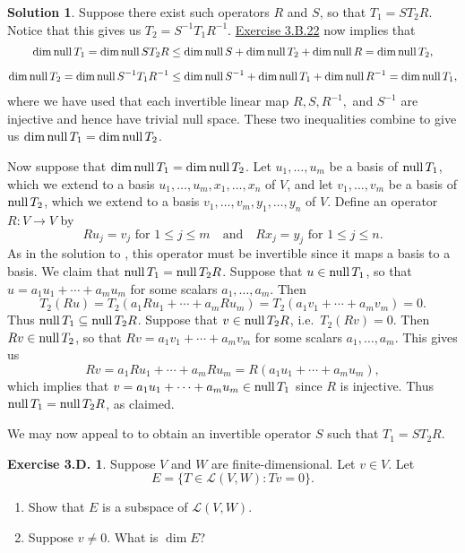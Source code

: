 \documentclass[12pt]{article}
\theoremstyle{definition}
\theoremstyle{exercise}
\newtheorem{exercise}{Exercise 3.D.}
\theoremstyle{solution}
\newtheorem*{solution}{Solution}
\newcommand{\lmap}{\mathcal{L}}
\newcommand{\Null}{\text{null\,}}
\newcommand{\quand}{\quad \text{and} \quad}
\begin{document}
\begin{solution}
    Suppose there exist such operators \( R \) and \( S \), so that \( T_1 = ST_2R \). Notice that this gives us \( T_2 = S^{-1}T_1R^{-1} \). \href{https://lew98.github.io/Mathematics/LADR_Section_3_B_Exercises.pdf}{Exercise 3.B.22} now implies that
    \begin{gather*}
        \dim \Null T_1 = \dim \Null ST_2R \leq \dim \Null S + \dim \Null T_2 + \dim \Null R = \dim \Null T_2, \\[2mm]
        \dim \Null T_2 = \dim \Null S^{-1}T_1R^{-1} \leq \dim \Null S^{-1} + \dim \Null T_1 + \dim \Null R^{-1} = \dim \Null T_1,
    \end{gather*}
    where we have used that each invertible linear map \( R, S, R^{-1}, \) and \( S^{-1} \) are injective and hence have trivial null space. These two inequalities combine to give us \( \dim \Null T_1 = \dim \Null T_2 \).

    Now suppose that \( \dim \Null T_1 = \dim \Null T_2 \). Let \( u_1, \ldots, u_m \) be a basis of  \( \Null T_1 \), which we extend to a basis \( u_1, \ldots, u_m, x_1, \ldots, x_n \) of \( V \), and let \( v_1, \ldots, v_m \) be a basis of \( \Null T_2 \), which we extend to a basis \( v_1, \ldots, v_m, y_1, \ldots, y_n \) of \( V \). Define an operator \( R : V \to V \) by
    \[
        Ru_j = v_j \text{ for } 1 \leq j \leq m \quand Rx_j = y_j \text{ for } 1 \leq j \leq n.
    \]
    As in the solution to , this operator must be invertible since it maps a basis to a basis. We claim that \( \Null T_1 = \Null T_2R \). Suppose that \( u \in \Null T_1 \), so that \( u = a_1 u_1 + \cdots + a_m u_m \) for some scalars \( a_1, \ldots, a_m \). Then
    \[
        T_2(Ru) = T_2(a_1 Ru_1 + \cdots + a_m Ru_m) = T_2(a_1 v_1 + \cdots + a_m v_m) = 0.
    \]
    Thus \( \Null T_1 \subseteq \Null T_2R \). Suppose that \( v \in \Null T_2R \), i.e.\ \( T_2(Rv) = 0 \). Then \( Rv \in \Null T_2 \), so that \( Rv = a_1 v_1 + \cdots + a_m v_m \) for some scalars \( a_1, \ldots, a_m \). This gives us
    \[
        Rv = a_1 Ru_1 + \cdots + a_m Ru_m = R(a_1 u_1 + \cdots + a_m u_m),
    \]
    which implies that \( v = a_1 u_1 + \cdots + a_m u_m \in \Null T_1 \) since \( R \) is injective. Thus \( \Null T_1 = \Null T_2R \), as claimed.

    We may now appeal to  to obtain an invertible operator \( S \) such that \( T_1 = ST_2R \).
\end{solution}

\begin{exercise}
\label{ex:7}
    Suppose \( V \) and \( W \) are finite-dimensional. Let \( v \in V \). Let
    \[
        E = \{ T \in \lmap(V, W) : Tv = 0 \}.
    \]
    \begin{enumerate}
        \item Show that \( E \) is a subspace of \( \lmap(V, W) \).

        \item Suppose \( v \neq 0 \). What is \( \dim E \)?
    \end{enumerate}
\end{exercise}
\end{document}
